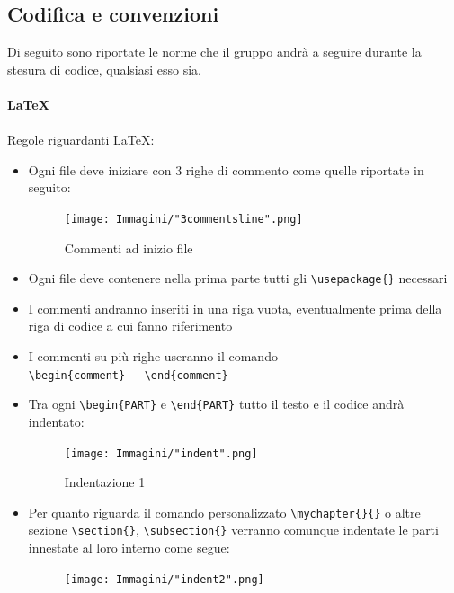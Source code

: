 \documentclass[a4paper]{report}
\newcommand{\mychapter}[2]{
	\setcounter{chapter}{#1}
	\setcounter{section}{0}
	\setcounter{subsection}{1}
	\chapter*{#2}
	\addcontentsline{toc}{chapter}{#2}
}
\begin{document}
	\subsection{Codifica e convenzioni}
	Di seguito sono riportate le norme che il gruppo andrà a seguire durante la stesura di codice, qualsiasi esso sia.
	\\ \\
	\textbf{\LaTeX} \\ \\ 
	Regole riguardanti \LaTeX :
	\begin{itemize}
		\item Ogni file deve iniziare con 3 righe di commento come quelle riportate in seguito:
		\begin{figure}[h!]
			\centering
			\texttt{[image: Immagini/"3commentsline".png]}
			\caption{Commenti ad inizio file}
		\end{figure}
		\item Ogni file deve contenere nella prima parte tutti gli \verb|\usepackage{}| necessari
		\item I commenti andranno inseriti in una riga vuota, eventualmente prima della riga di 
		codice a cui fanno riferimento
		\item I commenti su più righe useranno il comando \\ \verb|\begin{comment} - \end{comment}|
		\item Tra ogni \verb|\begin{PART}| e \verb|\end{PART}| tutto il testo e il codice andrà indentato:
		\begin{figure}[h!]
			\centering
			\texttt{[image: Immagini/"indent".png]}
			\caption{Indentazione 1}
		\end{figure}
		\item Per quanto riguarda il comando personalizzato \verb|\mychapter{}{}| o altre sezione \verb|\section{}|, \verb|\subsection{}| 
		verranno comunque indentate le parti innestate al loro interno come segue:
		\begin{figure}[h!]
			\centering
			\texttt{[image: Immagini/"indent2".png]}

\end{figure}
\end{itemize}
\end{document}
